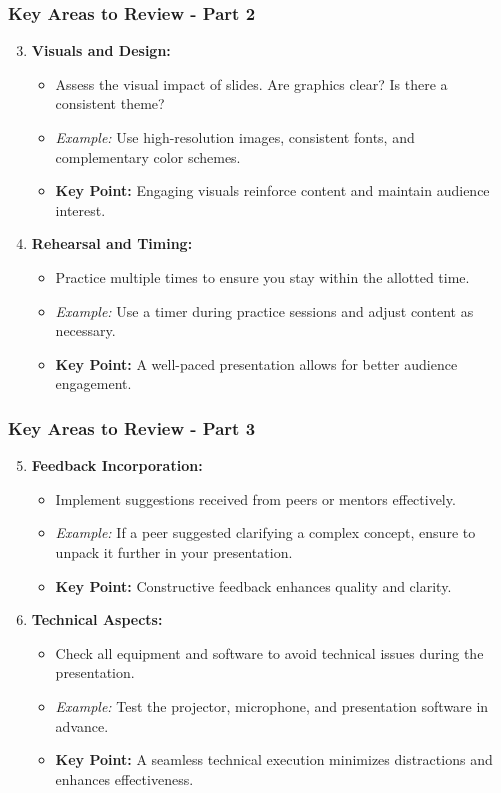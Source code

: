 \documentclass[aspectratio=169]{beamer}
\begin{document}
\begin{frame}[fragile]
    \frametitle{Key Areas to Review - Part 2}
    \begin{enumerate}
        \setcounter{enumi}{2}
        \item \textbf{Visuals and Design:}
        \begin{itemize}
            \item Assess the visual impact of slides. Are graphics clear? Is there a consistent theme?
            \item \textit{Example:} Use high-resolution images, consistent fonts, and complementary color schemes.
            \item \textbf{Key Point:} Engaging visuals reinforce content and maintain audience interest.
        \end{itemize}

        \item \textbf{Rehearsal and Timing:}
        \begin{itemize}
            \item Practice multiple times to ensure you stay within the allotted time.
            \item \textit{Example:} Use a timer during practice sessions and adjust content as necessary.
            \item \textbf{Key Point:} A well-paced presentation allows for better audience engagement.
        \end{itemize}
    \end{enumerate}
\end{frame}

\begin{frame}[fragile]
    \frametitle{Key Areas to Review - Part 3}
    \begin{enumerate}
        \setcounter{enumi}{4}
        \item \textbf{Feedback Incorporation:}
        \begin{itemize}
            \item Implement suggestions received from peers or mentors effectively.
            \item \textit{Example:} If a peer suggested clarifying a complex concept, ensure to unpack it further in your presentation.
            \item \textbf{Key Point:} Constructive feedback enhances quality and clarity.
        \end{itemize}

        \item \textbf{Technical Aspects:}
        \begin{itemize}
            \item Check all equipment and software to avoid technical issues during the presentation.
            \item \textit{Example:} Test the projector, microphone, and presentation software in advance.
            \item \textbf{Key Point:} A seamless technical execution minimizes distractions and enhances effectiveness.
        \end{itemize}
    \end{enumerate}
\end{frame}
\end{document}
